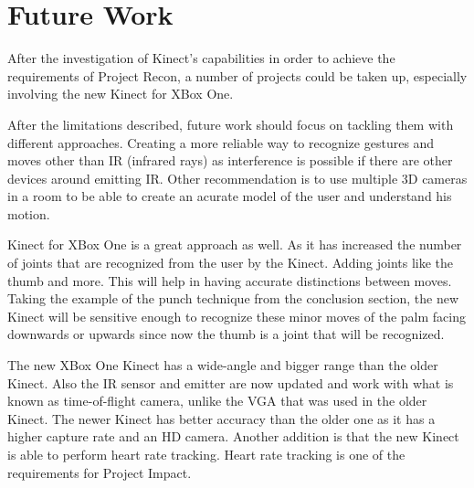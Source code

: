 \chapter{Future Work}
\label{chap:todo}
After the investigation of Kinect's capabilities in order to achieve the requirements of Project Recon, a number of projects could be taken up, especially involving the new Kinect for XBox One.

After the limitations described, future work should focus on tackling them with different approaches. Creating a more reliable way to recognize gestures and moves other than IR (infrared rays) as interference is possible if there are other devices around emitting IR. Other recommendation is to use multiple 3D cameras in a room to be able to create an acurate model of the user and understand his motion.

Kinect for XBox One is a great approach as well. As it has increased the number of joints that are recognized from the user by the Kinect. Adding joints like the thumb and more. This will help in having accurate distinctions between moves. Taking the example of the punch technique from the conclusion section, the new Kinect will be sensitive enough to recognize these minor moves of the palm facing downwards or upwards since now the thumb is a joint that will be recognized.

The new XBox One Kinect has a wide-angle and bigger range than the older Kinect. Also the IR sensor and emitter are now updated and work with what is known as time-of-flight camera, unlike the VGA that was used in the older Kinect. The newer Kinect has better accuracy than the older one as it has a higher capture rate and an HD camera. Another addition is that the new Kinect is able to perform heart rate tracking. Heart rate tracking is one of the requirements for Project Impact.